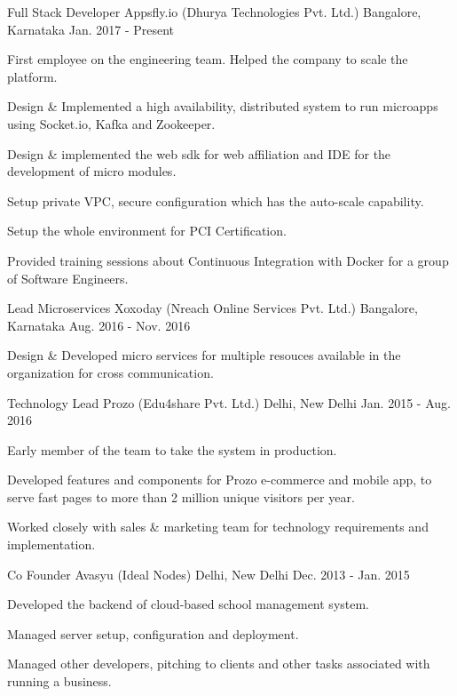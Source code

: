 \begin{cventries}
  \cventry
    {Full Stack Developer}
    {Appsfly.io (Dhurya Technologies Pvt. Ltd.)}
    {Bangalore, Karnataka}
    {Jan. 2017 - Present}
    {
      \begin{cvitems}
        \item {First employee on the engineering team. Helped the company to scale the platform.}
        \item {Design \& Implemented a high availability, distributed system to run microapps using Socket.io, Kafka and Zookeeper.}
        \item {Design \& implemented the web sdk for web affiliation and IDE for the development of micro modules.}
        \item {Setup private VPC, secure configuration which has the auto-scale capability.}
        \item {Setup the whole environment for PCI Certification.}
        \item {Provided training sessions about Continuous Integration with Docker for a group of Software Engineers.}
      \end{cvitems}
    }
  \cventry
    {Lead Microservices}
    {Xoxoday (Nreach Online Services Pvt. Ltd.)}
    {Bangalore, Karnataka}
    {Aug. 2016 - Nov. 2016}
    {
      \begin{cvitems}
        \item {Design \& Developed micro services for multiple resouces available in the organization for cross communication.}
      \end{cvitems}
    }
  \cventry
    {Technology Lead}
    {Prozo (Edu4share Pvt. Ltd.)}
    {Delhi, New Delhi}
    {Jan. 2015 - Aug. 2016}
    {
      \begin{cvitems}
        \item {Early member of the team to take the system in production.}
        \item {Developed features and components for Prozo e-commerce and mobile app, to serve fast pages to more than 2 million unique visitors per year.}
        \item {Worked closely with sales \& marketing team for technology requirements and implementation.}
      \end{cvitems}
    }
  \cventry
    {Co Founder}
    {Avasyu (Ideal Nodes)}
    {Delhi, New Delhi}
    {Dec. 2013 - Jan. 2015}
    {
      \begin{cvitems}
        \item {Developed the backend of cloud-based school management system.}
        \item {Managed server setup, configuration and deployment.}
        \item {Managed other developers, pitching to clients and other tasks associated with running a business.}
      \end{cvitems}
    }
\end{cventries}